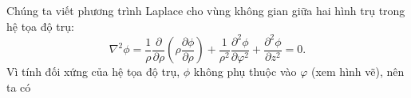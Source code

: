 \begin{loigiai}\[\]
Chúng ta viết phương trình Laplace cho vùng không gian giữa hai hình trụ trong hệ tọa độ trụ:
   $$\nabla^{2} \phi=\frac{1}{\rho} \frac{\partial}{\partial \rho}\left(\rho \frac{\partial \phi}{\partial \rho}\right)+\frac{1}{\rho^{2}} \frac{\partial^{2} \phi}{\partial \varphi^{2}}+\frac{\partial^{2} \phi}{\partial z^{2}}=0.$$
Vì tính đối xứng của hệ tọa độ trụ, $\phi$ không phụ thuộc vào $\varphi$ (xem hình vẽ), nên ta có
          \begin{center}

\begin{tikzpicture}[x=0.75pt,y=0.75pt,yscale=-1,xscale=1]


\end{tikzpicture}
\end{center}
\end{loigiai}
